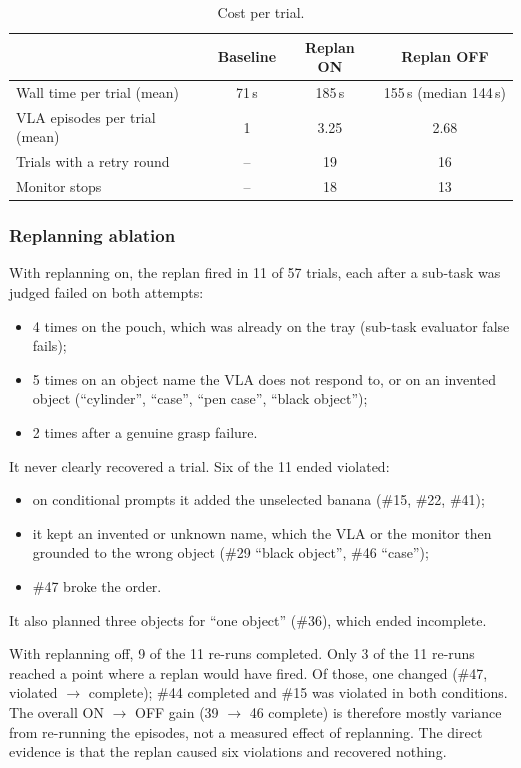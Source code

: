 \begin{table}[t]
  \centering
  \caption{Cost per trial.}
  \label{tab:pref-cost}
  \begin{tabular}{lccc}
    \toprule
     & Baseline & Replan ON & Replan OFF \\
    \midrule
    Wall time per trial (mean)    & 71\,s & 185\,s & 155\,s (median 144\,s) \\
    VLA episodes per trial (mean) & 1     & 3.25   & 2.68 \\
    Trials with a retry round     & --    & 19     & 16 \\
    Monitor stops                 & --    & 18     & 13 \\
    \bottomrule
  \end{tabular}
\end{table}

\subsubsection{Replanning ablation}
With replanning on, the replan fired in 11 of 57 trials, each after a sub-task was judged
failed on both attempts:
\begin{itemize}
  \item 4 times on the pouch, which was already on the tray (sub-task evaluator false
    fails);
  \item 5 times on an object name the VLA does not respond to, or on an invented object
    (``cylinder'', ``case'', ``pen case'', ``black object'');
  \item 2 times after a genuine grasp failure.
\end{itemize}
It never clearly recovered a trial. Six of the 11 ended violated:
\begin{itemize}
  \item on conditional prompts it added the unselected banana (\#15, \#22, \#41);
  \item it kept an invented or unknown name, which the VLA or the monitor then grounded to
    the wrong object (\#29 ``black object'', \#46 ``case'');
  \item \#47 broke the order.
\end{itemize}
It also planned three objects for ``one object'' (\#36), which ended incomplete.

With replanning off, 9 of the 11 re-runs completed. Only 3 of the 11 re-runs reached a
point where a replan would have fired. Of those, one changed (\#47, violated
$\rightarrow$ complete); \#44 completed and \#15 was violated in both conditions. The
overall ON $\rightarrow$ OFF gain (39 $\rightarrow$ 46 complete) is therefore mostly
variance from re-running the episodes, not a measured effect of replanning. The direct
evidence is that the replan caused six violations and recovered nothing.

